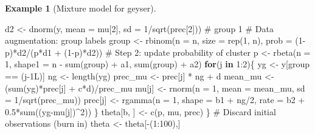 \documentclass[
  11pt,
  letterpaper,
]{scrbook}
\newenvironment{Shaded}{\begin{snugshade}}{\end{snugshade}}
\newcommand{\AttributeTok}[1]{\textcolor[rgb]{0.40,0.45,0.13}{#1}}
\newcommand{\CommentTok}[1]{\textcolor[rgb]{0.37,0.37,0.37}{#1}}
\newcommand{\ControlFlowTok}[1]{\textcolor[rgb]{0.00,0.23,0.31}{\textbf{#1}}}
\newcommand{\DecValTok}[1]{\textcolor[rgb]{0.68,0.00,0.00}{#1}}
\newcommand{\FloatTok}[1]{\textcolor[rgb]{0.68,0.00,0.00}{#1}}
\newcommand{\FunctionTok}[1]{\textcolor[rgb]{0.28,0.35,0.67}{#1}}
\newcommand{\NormalTok}[1]{\textcolor[rgb]{0.00,0.23,0.31}{#1}}
\newcommand{\OtherTok}[1]{\textcolor[rgb]{0.00,0.23,0.31}{#1}}
\newcommand{\SpecialCharTok}[1]{\textcolor[rgb]{0.37,0.37,0.37}{#1}}
\theoremstyle{definition}
\newtheorem{example}{Example}[chapter]
\theoremstyle{plain}
\theoremstyle{plain}
\theoremstyle{plain}
\theoremstyle{definition}
\theoremstyle{definition}
\theoremstyle{plain}
\theoremstyle{plain}
\theoremstyle{remark}
\begin{document}
\begin{example}[Mixture model for
geyser]
\begin{Shaded}
\begin{Highlighting}[]
\NormalTok{  d2 }\OtherTok{\textless{}{-}} \FunctionTok{dnorm}\NormalTok{(y, }\AttributeTok{mean =}\NormalTok{ mu[}\DecValTok{2}\NormalTok{], }\AttributeTok{sd =} \DecValTok{1}\SpecialCharTok{/}\FunctionTok{sqrt}\NormalTok{(prec[}\DecValTok{2}\NormalTok{])) }\CommentTok{\# group 1}
  \CommentTok{\# Data augmentation: group labels}
\NormalTok{  group }\OtherTok{\textless{}{-}} \FunctionTok{rbinom}\NormalTok{(}\AttributeTok{n =}\NormalTok{ n, }\AttributeTok{size =} \FunctionTok{rep}\NormalTok{(}\DecValTok{1}\NormalTok{, n), }\AttributeTok{prob =}\NormalTok{ (}\DecValTok{1}\SpecialCharTok{{-}}\NormalTok{p)}\SpecialCharTok{*}\NormalTok{d2}\SpecialCharTok{/}\NormalTok{(p}\SpecialCharTok{*}\NormalTok{d1 }\SpecialCharTok{+}\NormalTok{ (}\DecValTok{1}\SpecialCharTok{{-}}\NormalTok{p)}\SpecialCharTok{*}\NormalTok{d2))}
  \CommentTok{\# Step 2: update probability of cluster}
\NormalTok{  p }\OtherTok{\textless{}{-}} \FunctionTok{rbeta}\NormalTok{(}\AttributeTok{n =} \DecValTok{1}\NormalTok{, }\AttributeTok{shape1 =}\NormalTok{ n }\SpecialCharTok{{-}} \FunctionTok{sum}\NormalTok{(group) }\SpecialCharTok{+}\NormalTok{ a1, }\FunctionTok{sum}\NormalTok{(group) }\SpecialCharTok{+}\NormalTok{ a2)}
  \ControlFlowTok{for}\NormalTok{(j }\ControlFlowTok{in} \DecValTok{1}\SpecialCharTok{:}\DecValTok{2}\NormalTok{)\{}
\NormalTok{    yg }\OtherTok{\textless{}{-}}\NormalTok{ y[group }\SpecialCharTok{==}\NormalTok{ (j}\DecValTok{{-}1}\NormalTok{L)]}
\NormalTok{    ng }\OtherTok{\textless{}{-}} \FunctionTok{length}\NormalTok{(yg)}
\NormalTok{    prec\_mu }\OtherTok{\textless{}{-}}\NormalTok{ prec[j] }\SpecialCharTok{*}\NormalTok{ ng }\SpecialCharTok{+}\NormalTok{ d}
\NormalTok{    mean\_mu }\OtherTok{\textless{}{-}}\NormalTok{ (}\FunctionTok{sum}\NormalTok{(yg)}\SpecialCharTok{*}\NormalTok{prec[j] }\SpecialCharTok{+}\NormalTok{ c}\SpecialCharTok{*}\NormalTok{d)}\SpecialCharTok{/}\NormalTok{prec\_mu}
\NormalTok{    mu[j] }\OtherTok{\textless{}{-}} \FunctionTok{rnorm}\NormalTok{(}\AttributeTok{n =} \DecValTok{1}\NormalTok{, }\AttributeTok{mean =}\NormalTok{ mean\_mu, }\AttributeTok{sd =} \DecValTok{1}\SpecialCharTok{/}\FunctionTok{sqrt}\NormalTok{(prec\_mu))}
\NormalTok{    prec[j] }\OtherTok{\textless{}{-}} \FunctionTok{rgamma}\NormalTok{(}\AttributeTok{n =} \DecValTok{1}\NormalTok{, }
                      \AttributeTok{shape =}\NormalTok{ b1 }\SpecialCharTok{+}\NormalTok{ ng}\SpecialCharTok{/}\DecValTok{2}\NormalTok{, }
                      \AttributeTok{rate =}\NormalTok{ b2 }\SpecialCharTok{+} \FloatTok{0.5}\SpecialCharTok{*}\FunctionTok{sum}\NormalTok{((yg}\SpecialCharTok{{-}}\NormalTok{mu[j])}\SpecialCharTok{\^{}}\DecValTok{2}\NormalTok{))}
\NormalTok{  \}}
\NormalTok{  theta[b, ] }\OtherTok{\textless{}{-}} \FunctionTok{c}\NormalTok{(p, mu, prec)}
\NormalTok{\}}
\CommentTok{\# Discard initial observations (burn in)}
\NormalTok{theta }\OtherTok{\textless{}{-}}\NormalTok{ theta[}\SpecialCharTok{{-}}\NormalTok{(}\DecValTok{1}\SpecialCharTok{:}\DecValTok{100}\NormalTok{),]}
\end{Highlighting}
\end{Shaded}


\end{example}
\end{document}

